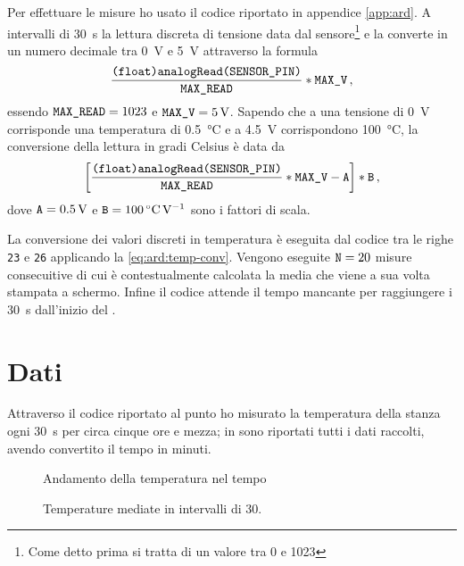             Per effettuare le misure ho usato il codice riportato in appendice \ref{app:ard}. A intervalli di \SI{30}{\second} la lettura discreta di tensione data dal sensore\footnote{Come detto prima si tratta di un valore tra \num{0} e \num{1023}} e la converte in un numero decimale tra \SI{0}{\volt} e \SI{5}{V} attraverso la formula
            \begin{equation*}
                \frac{\text{\ttfamily (float)analogRead(SENSOR\_PIN)}}{\text{\ttfamily MAX\_READ}} * \text{\ttfamily MAX\_V}
                \,,
            \end{equation*}
            essendo $\text{\ttfamily MAX\_READ} = 1023$ e $\text{\ttfamily MAX\_V} = \SI{5}{\volt}$. Sapendo che a una tensione di \SI{0}{\volt} corrisponde una temperatura di \SI{0.5}{\celsius} e a \SI{4.5}{\volt} corrispondono \SI{100}{\celsius}, la conversione della lettura in gradi Celsius è data da
            \begin{equation}
                \bqty{\frac{\text{\ttfamily (float)analogRead(SENSOR\_PIN)}}{\text{\ttfamily MAX\_READ}} * \text{\ttfamily MAX\_V} - \text{\ttfamily A}} * \text{\ttfamily B}
                \mycomma
                \label{eq:ard:temp-conv}
            \end{equation}
            dove $\text{\ttfamily A} = \SI{0.5}{\volt}$ e $\text{\ttfamily B} = \SI{100}{\celsius\per\volt}$ sono i fattori di scala.

            La conversione dei valori discreti in temperatura è eseguita dal codice tra le righe \texttt{23} e \texttt{26} applicando la \eqref{eq:ard:temp-conv}. Vengono eseguite $\text{\ttfamily N} = 20$ misure consecuitive di cui è contestualmente calcolata la media che viene a sua volta stampata a schermo. Infine il codice attende il tempo mancante per raggiungere i \SI{30}{\second} dall'inizio del \txtloop.

    \section{Dati}
        Attraverso il codice riportato al punto  ho misurato la temperatura della stanza ogni \SI{30}{s} per circa cinque ore e mezza; in  sono riportati tutti i dati raccolti, avendo convertito il tempo in minuti.

        \begin{figure}
            \centering
            
            \caption{Andamento della temperatura nel tempo}
            \label{fig:ard:raw-temp}
        \end{figure}%
        \begin{figure}
            \centering
            
            \caption{Temperature mediate in intervalli di \SI{30}{\min}.}
            \label{fig:ard:avg-temp}
        \end{figure}

